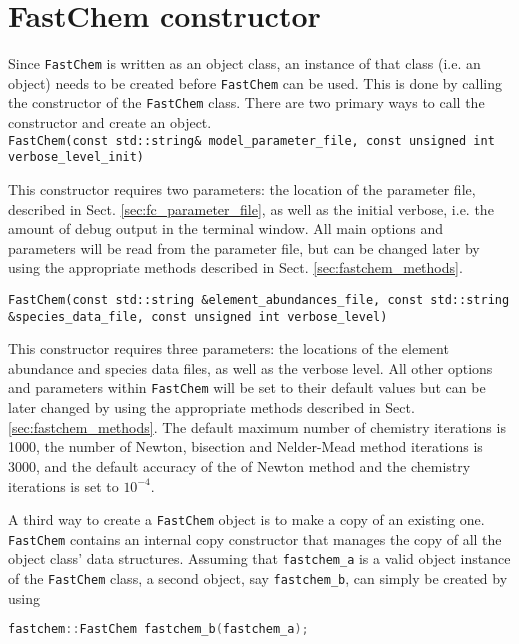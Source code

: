 \documentclass[numbers=noenddot]{fcmanual}
\newcommand{\fc}{\texttt{FastChem}\xspace}
\begin{document}
\section{FastChem constructor}
Since \fc is written as an object class, an instance of that class (i.e. an object) needs to be created before \fc can be used. This is done by calling the constructor of the \fc class. There are two primary ways to call the constructor and create an object.\\

\lstinline!FastChem(const std::string& model_parameter_file, const unsigned int verbose_level_init)!
\begin{addmargin}[25pt]{0pt}
  This constructor requires two parameters: the location of the parameter file, described in Sect. \ref{sec:fc_parameter_file}, as well as the initial verbose, i.e. the amount of debug output in the terminal window. All main options and parameters will be read from the parameter file, but can be changed later by using the appropriate methods described in Sect. \ref{sec:fastchem_methods}.
\end{addmargin}

\bigbreak

\lstinline[breaklines=true]!FastChem(const std::string &element_abundances_file, const std::string &species_data_file, const unsigned int verbose_level)!
\begin{addmargin}[25pt]{0pt}
  This constructor requires three parameters: the locations of the element abundance and species data files, as well as the verbose level. All other options and parameters within \fc will be set to their default values but can be later changed by using the appropriate methods described in Sect. \ref{sec:fastchem_methods}. The default maximum number of chemistry iterations is 1000, the number of Newton, bisection and Nelder-Mead method iterations is 3000, and the default accuracy of the of Newton method and the chemistry iterations is set to $10^{-4}$.
\end{addmargin}

\bigbreak

A third way to create a \fc object is to make a copy of an existing one. \fc contains an internal copy constructor that manages the copy of all the object class' data structures. Assuming that \lstinline!fastchem_a! is a valid object instance of the \fc class, a second object, say \lstinline!fastchem_b!, can simply be created by using 
\begin{lstlisting}[language=C++]
  fastchem::FastChem fastchem_b(fastchem_a);
\end{lstlisting}
\end{document}
